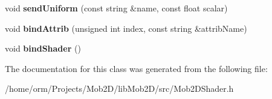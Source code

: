 \begin{DoxyCompactItemize}
\item 
\hypertarget{classMob2DFx_a9f2ed19b9537faab09c83fff29df184b}{
void {\bfseries sendUniform} (const string \&name, const float scalar)}
\label{classMob2DFx_a9f2ed19b9537faab09c83fff29df184b}

\item 
\hypertarget{classMob2DFx_a9134ccc31ceaa06bc32bee343b978291}{
void {\bfseries bindAttrib} (unsigned int index, const string \&attribName)}
\label{classMob2DFx_a9134ccc31ceaa06bc32bee343b978291}

\item 
\hypertarget{classMob2DFx_a4dd56a3861000692973e11606ece4014}{
void {\bfseries bindShader} ()}
\label{classMob2DFx_a4dd56a3861000692973e11606ece4014}

\end{DoxyCompactItemize}


The documentation for this class was generated from the following file:\begin{DoxyCompactItemize}
\item 
/home/orm/Projects/Mob2D/libMob2D/src/Mob2DShader.h\end{DoxyCompactItemize}
